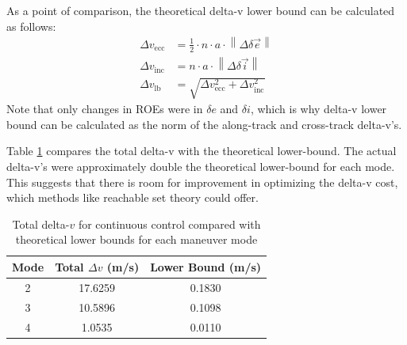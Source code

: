 As a point of comparison, the theoretical delta-v lower bound can be calculated as follows:
\begin{align*}
\Delta v_{\text{ecc}} &= \frac{1}{2} \cdot n \cdot a \cdot \left\| \Delta \delta\vec{e} \right\| \\
\Delta v_{\text{inc}} &= n \cdot a \cdot \left\| \Delta \delta\vec{i} \right\| \\
\Delta v_{\text{lb}} &= \sqrt{\Delta v_{\text{ecc}}^2 + \Delta v_{\text{inc}}^2}
\end{align*}
Note that only changes in ROEs were in $\delta e$ and $\delta i$, which is why delta-v lower bound can be calculated as the norm of the along-track and cross-track delta-v's. 

Table \ref{tab:dv_comparison_continuous} compares the total delta-v with the theoretical lower-bound. The actual delta-v's were approximately double the theoretical lower-bound for each mode. This suggests that there is room for improvement in optimizing the delta-v cost, which methods like reachable set theory could offer. 
\begin{table}[h!]
\centering
\begin{tabular}{|c|c|c|}
\hline
\textbf{Mode} & \textbf{Total }$\Delta v$ \textbf{(m/s)} & \textbf{Lower Bound (m/s)} \\
\hline
2 & 17.6259 & 0.1830 \\
3 & 10.5896 & 0.1098 \\
4 & 1.0535 & 0.0110 \\
\hline
\end{tabular}
\caption{Total delta-$v$ for continuous control compared with theoretical lower bounds for each maneuver mode}
\label{tab:dv_comparison_continuous}
\end{table}
